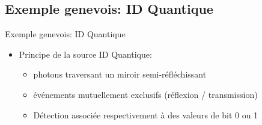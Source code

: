 \documentclass{beamer}
\begin{document}
\subsection{Exemple genevois: ID Quantique}
\begin{frame}{Exemple genevois: ID Quantique}
  \begin{itemize}
  \item Principe de la source ID Quantique:
    \begin{itemize}
    \item photons traversant un miroir semi-réfléchissant
    \item événements mutuellement exclusifs (réflexion / transmission)
    \item Détection associée respectivement à des valeurs de bit 0 ou 1
    \end{itemize}
  \end{itemize}
\end{frame}
\end{document}
